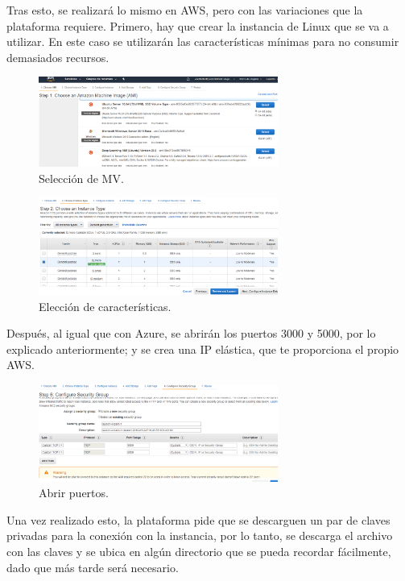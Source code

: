 \documentclass[english,runningheads,a4paper]{llncs}[2018/03/10]
\begin{document}
Tras esto, se realizará lo mismo en AWS, pero con las variaciones que la plataforma
requiere. Primero, hay que crear la instancia de Linux que se va a utilizar. En
este caso se utilizarán las características mínimas para no consumir demasiados
recursos.

\begin{figure}[h!]
 \centering
 \includegraphics[width=0.7\textwidth]{./Web/AWS/AWS1.png}
 \caption{Selección de MV.}
\end{figure}

\begin{figure}[h!]
 \centering
 \includegraphics[width=0.7\textwidth]{./Web/AWS/AWS2.png}
 \caption{Elección de características.}
\end{figure}

Después, al igual que con Azure, se abrirán los puertos 3000 y 5000, por lo
explicado anteriormente; y se crea una IP elástica, que te proporciona el propio
AWS.

\begin{figure}[h!]
 \centering
 \includegraphics[width=0.7\textwidth]{./Web/AWS/AWS3.png}
 \caption{Abrir puertos.}
\end{figure}

Una vez realizado esto, la plataforma pide que se descarguen un par de claves
privadas para la conexión con la instancia, por lo tanto, se descarga el archivo
con las claves y se ubica en algún directorio que se pueda recordar fácilmente,
dado que más tarde será necesario.
\end{document}
